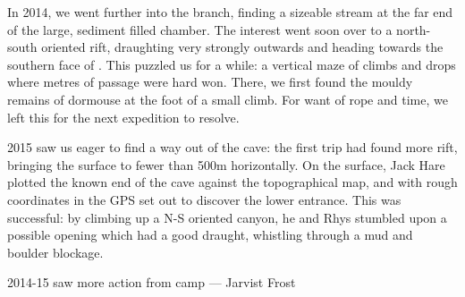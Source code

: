 In 2014, we went further into the  branch, finding a sizeable stream at the far end of the large, sediment filled  chamber. The interest went soon over to a north-south oriented rift, draughting very strongly outwards and heading towards the southern face of . This puzzled us for a while: a vertical maze of climbs and drops where metres of passage were hard won. There, we first found the mouldy remains of dormouse at the foot of a small climb. For want of rope and time, we left this for the next expedition to resolve.



2015 saw us eager to find a way out of the cave: the first trip had found more rift, bringing the surface to fewer than 500m horizontally. On the surface, Jack Hare plotted the known end of the cave against the topographical map, and with rough coordinates in the GPS set out to discover the lower entrance. This was successful: by climbing up a N-S oriented canyon, he and Rhys stumbled upon a possible opening which had a good draught, whistling through a mud and boulder blockage. 

\begin{marginfigure}
	\checkoddpage \ifoddpage \forcerectofloat \else \forceversofloat \fi
	\centering	{} 
  	\caption{2014-15 saw more action from camp \protect{}--- Jarvist Frost}
	\end{marginfigure}

